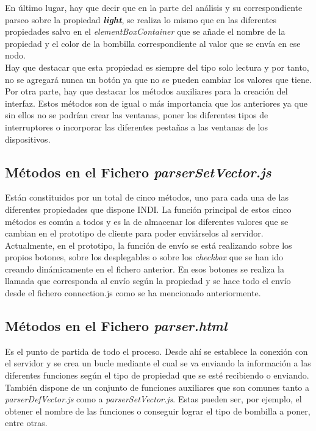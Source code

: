 En último lugar, hay que decir que en la parte del análisis y su correspondiente parseo sobre la propiedad \textbf{\textit{light}}, se realiza lo mismo que en las diferentes propiedades salvo en el \textit{elementBoxContainer} que se añade el nombre de la propiedad y el color de la bombilla correspondiente al valor que se envía en ese nodo.\\

Hay que destacar que esta propiedad es siempre del tipo solo lectura y por tanto, no se agregará nunca un botón ya que no se pueden cambiar los valores que tiene.\\

Por otra parte, hay que destacar los métodos auxiliares para la creación del interfaz. Estos métodos son de igual o más importancia que los anteriores ya que sin ellos no se podrían crear las ventanas, poner los diferentes tipos de interruptores o incorporar las diferentes pestañas a las ventanas de los dispositivos.\\

\subsection{Métodos en el Fichero \textit{parserSetVector.js}}
Están constituidos por un total de cinco métodos, uno para cada una de las diferentes propiedades que dispone INDI.
La función principal de estos cinco métodos es común a todos y es la de almacenar los diferentes valores que se cambian en el prototipo de cliente para poder enviárselos al servidor.
Actualmente, en el prototipo, la función de envío se está realizando sobre los propios botones, sobre los desplegables o sobre los \textit{checkbox} que se han ido creando dinámicamente en el fichero anterior. En esos botones se realiza la llamada que corresponda al envío según la propiedad y se hace todo el envío desde el fichero connection.js como se ha mencionado anteriormente.

\subsection{Métodos en el Fichero \textit{parser.html}}
Es el punto de partida de todo el proceso. Desde ahí se establece la conexión con el servidor y se crea un bucle mediante el cual se va enviando la información a las diferentes funciones según el tipo de propiedad que se esté recibiendo o enviando.
También dispone de un conjunto de funciones auxiliares que son comunes tanto a \textit{parserDefVector.js} como a \textit{parserSetVector.js}. Estas pueden ser, por ejemplo, el obtener el nombre de las funciones o conseguir lograr el tipo de bombilla a poner, entre otras.


